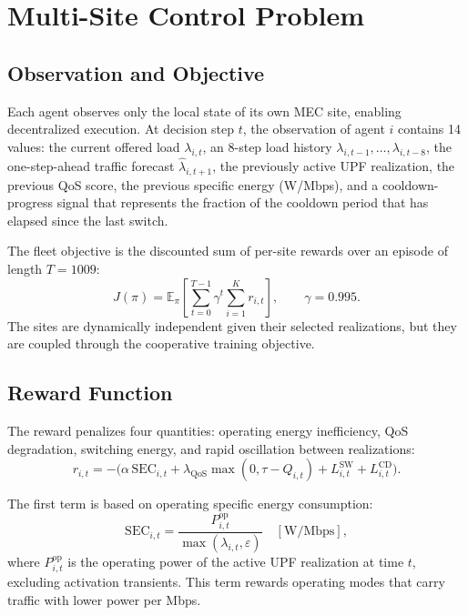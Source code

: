 \documentclass[10pt,conference,letterpaper]{IEEEtran}
\newcommand{\SECt}{\mathrm{SEC}}
\begin{document}
\section{Multi-Site Control Problem}
\label{sec:problem}

\subsection{Observation and Objective}

Each agent observes only the local state of its own MEC site, enabling decentralized execution. At decision step $t$, the observation of agent $i$ contains 14 values: the current offered load $\lambda_{i,t}$, an 8-step load history
$\lambda_{i,t-1},\ldots,\lambda_{i,t-8}$, the one-step-ahead traffic forecast
$\hat{\lambda}_{i,t+1}$, the previously active UPF realization, the previous QoS score, the previous specific energy (W/Mbps), and a cooldown-progress signal that represents the fraction of the cooldown period that has elapsed since the last switch.

The fleet objective is the discounted sum of per-site rewards over an episode of length $T=1009$:
\begin{equation}
J(\pi) =
\mathbb{E}_{\pi}\!\left[
\sum_{t=0}^{T-1}\gamma^{t}
\sum_{i=1}^{K} r_{i,t}
\right],
\qquad \gamma = 0.995 .
\end{equation}
The sites are dynamically independent given their selected realizations, but they are coupled through the cooperative training objective.

\subsection{Reward Function}

The reward penalizes four quantities: operating  energy inefficiency, QoS degradation, switching energy, and rapid oscillation between realizations:
\begin{equation}
\label{eq:reward}
r_{i,t} =
-\bigl(
\alpha\,\SECt_{i,t}
+
\lambda_{\mathrm{QoS}}\max(0,\tau-Q_{i,t})
+
L^{\mathrm{SW}}_{i,t}
+
L^{\mathrm{CD}}_{i,t}
\bigr).
\end{equation}

The first term is based on operating specific energy consumption:
\begin{equation}
\SECt_{i,t}
=
\frac{P^{\mathrm{op}}_{i,t}}
{\max(\lambda_{i,t},\varepsilon)}
\quad [\mathrm{W/Mbps}],
\end{equation}
where $P^{\mathrm{op}}_{i,t}$ is the operating power of the active UPF realization at time $t$, excluding activation transients. This term rewards operating modes that carry traffic with lower power per Mbps.
\end{document}

